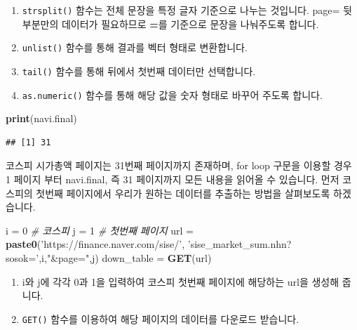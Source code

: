 \documentclass[12pt,]{book}
\newenvironment{Shaded}{\begin{snugshade}}{\end{snugshade}}
\newcommand{\CommentTok}[1]{\textcolor[rgb]{0.56,0.35,0.01}{\textit{#1}}}
\newcommand{\DecValTok}[1]{\textcolor[rgb]{0.00,0.00,0.81}{#1}}
\newcommand{\KeywordTok}[1]{\textcolor[rgb]{0.13,0.29,0.53}{\textbf{#1}}}
\newcommand{\NormalTok}[1]{#1}
\newcommand{\StringTok}[1]{\textcolor[rgb]{0.31,0.60,0.02}{#1}}
\providecommand{\tightlist}{%
  \setlength{\itemsep}{0pt}\setlength{\parskip}{0pt}}
\begin{document}
\begin{enumerate}
\def\labelenumi{\arabic{enumi}.}
\tightlist
\item
  \texttt{strsplit()} 함수는 전체 문장을 특정 글자 기준으로 나누는 것입니다. page= 뒷부분만의 데이터가 필요하므로 \textbf{=}를 기준으로 문장을 나눠주도록 합니다.
\item
  \texttt{unlist()} 함수를 통해 결과를 벡터 형태로 변환합니다.
\item
  \texttt{tail()} 함수를 통해 뒤에서 첫번째 데이터만 선택합니다.
\item
  \texttt{as.numeric()} 함수를 통해 해당 값을 숫자 형태로 바꾸어 주도록 합니다.
\end{enumerate}

\begin{Shaded}
\begin{Highlighting}[]
\KeywordTok{print}\NormalTok{(navi.final)}
\end{Highlighting}
\end{Shaded}

\begin{verbatim}
## [1] 31
\end{verbatim}

코스피 시가총액 페이지는 31번째 페이지까지 존재하며, for loop 구문을 이용할 경우 1 페이지 부터 navi.final, 즉 31 페이지까지 모든 내용을 읽어올 수 있습니다. 먼저 코스피의 첫번째 페이지에서 우리가 원하는 데이터를 추출하는 방법을 살펴보도록 하겠습니다.

\begin{Shaded}
\begin{Highlighting}[]
\NormalTok{i =}\StringTok{ }\DecValTok{0} \CommentTok{# 코스피}
\NormalTok{j =}\StringTok{ }\DecValTok{1} \CommentTok{# 첫번째 페이지}
\NormalTok{url =}\StringTok{ }\KeywordTok{paste0}\NormalTok{(}\StringTok{'https://finance.naver.com/sise/'}\NormalTok{,}
             \StringTok{'sise_market_sum.nhn?sosok='}\NormalTok{,i,}\StringTok{"&page="}\NormalTok{,j)}
\NormalTok{down_table =}\StringTok{ }\KeywordTok{GET}\NormalTok{(url)}
\end{Highlighting}
\end{Shaded}

\begin{enumerate}
\def\labelenumi{\arabic{enumi}.}
\tightlist
\item
  i와 j에 각각 0과 1을 입력하여 코스피 첫번째 페이지에 해당하는 url을 생성해 줍니다.
\item
  \texttt{GET()} 함수를 이용하여 해당 페이지의 데이터를 다운로드 받습니다.
\end{enumerate}
\end{document}
